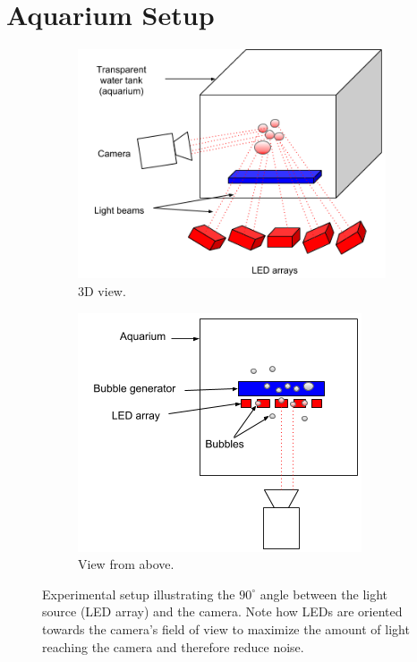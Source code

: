 	
		
	\section{Aquarium Setup}\label{aquarium_setup}
		\begin{figure}
			\begin{subfigure}[t]{.5\textwidth}
				\includegraphics[scale=.6]{images/aquarium_setup.png}
				\caption{3D view.}
				\label{subfig:aquarium_setup_above}
			\end{subfigure}\hfill
			\begin{subfigure}[t]{.4\textwidth}
				\includegraphics[scale=.6]{images/aquarium_setup_above.png}
				\caption{View from above.}
			\end{subfigure}
			\caption{Experimental setup illustrating the $90^\circ$ angle between the light source (LED array) and the camera. Note how LEDs are oriented towards the camera's field of view to maximize the amount of light reaching the camera and therefore reduce noise.}
			\label{fig:aquarium_setup}
		\end{figure}			
		
